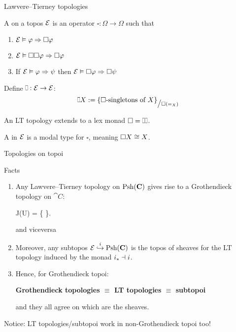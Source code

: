 \begin{frame}{Lawvere--Tierney topologies}
	\begin{definition}
		A  on a topos $\mathcal{E}$ is an operator $\square : \Omega \to \Omega$ such that
		\begin{enumerate}
			\item $\mathcal{E} \vDash \varphi \Rightarrow \square \varphi$ 
			\item $\mathcal{E} \vDash \square \square \varphi \Rightarrow \square \varphi$ 
			\item If $\mathcal{E} \vDash \varphi \Rightarrow \psi$ then $\mathcal{E} \vDash \square \varphi \Rightarrow \square \psi$ 
		\end{enumerate}
	\end{definition}
	Define $\halfsquare : \topos E \to \topos E$:
	\begin{equation*}
		\halfsquare X := \{ \text{$\square$-singletons of $X$} \}_{\big/ \square (=_X)}
	\end{equation*}
	\vspace{-5.5ex}
	\begin{proposition}
		An LT topology extends to a lex monad $\square = \halfsquare \halfsquare$.
	\end{proposition}
	\begin{definition}
		A  in $\mathcal{E}$ is a modal type for $\square$, meaning $\square X \overset{}{\cong} X$.
	\end{definition}
\end{frame}

\begin{frame}{Topologies on topoi}
	\begin{block}{Facts}
		\begin{enumerate}
			\item Any Lawvere--Tierney topology on $\operatorname{Psh}(\mathbf{C})$ gives rise to a Grothendieck topology on $\cat C$:
			\begin{eqalign*}
				J(U) = \{  \suchthat {}\}.
			\end{eqalign*}
			and viceversa
			\item Moreover, any subtopos $\mathcal{E} \overset{i}{\hookrightarrow} \operatorname{Psh} (\mathbf{C})$ is the topos of sheaves for the LT topology induced by the monad $i_* \dashv i$.
			\item Hence, for Grothendieck topoi:
			\begin{center}
			\bfseries
				Grothendieck topologies $\equiv$ LT topologies $\equiv$ subtopoi
			\end{center}
			and they all agree on which are the sheaves.
		\end{enumerate}
	\end{block}
	Notice: LT topologies/subtopoi work in non-Grothendieck topoi too!
\end{frame}

